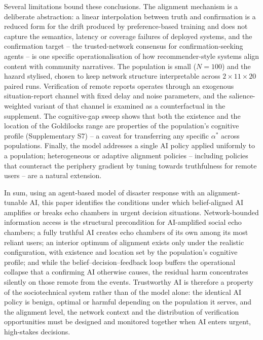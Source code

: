 \documentclass[pdflatex,sn-nature]{sn-jnl}
\begin{document}
Several limitations bound these conclusions. The alignment mechanism is a deliberate abstraction: a linear interpolation between truth and confirmation is a reduced form for the drift produced by preference-based training \citep{sharma2024sycophancy} and does not capture the semantics, latency or coverage failures of deployed systems, and the confirmation target -- the trusted-network consensus for confirmation-seeking agents -- is one specific operationalisation of how recommender-style systems align content with community narratives. The population is small ($N = 100$) and the hazard stylised, chosen to keep network structure interpretable across $2 \times 11 \times 20$ paired runs. Verification of remote reports operates through an exogenous situation-report channel with fixed delay and noise parameters, and the salience-weighted variant of that channel is examined as a counterfactual in the supplement. The cognitive-gap sweep shows that both the existence and the location of the Goldilocks range are properties of the population's cognitive profile (Supplementary S7) -- a caveat for transferring any specific $\alpha^{*}$ across populations. Finally, the model addresses a single AI policy applied uniformly to a population; heterogeneous or adaptive alignment policies -- including policies that counteract the periphery gradient by tuning towards truthfulness for remote users -- are a natural extension.

In sum, using an agent-based model of disaster response with an alignment-tunable AI, this paper identifies the conditions under which belief-aligned AI amplifies or breaks echo chambers in urgent decision situations. Network-bounded information access is the structural precondition for AI-amplified social echo chambers; a fully truthful AI creates echo chambers of its own among its most reliant users; an interior optimum of alignment exists only under the realistic configuration, with existence and location set by the population's cognitive profile; and while the belief--decision--feedback loop buffers the operational collapse that a confirming AI otherwise causes, the residual harm concentrates silently on those remote from the events. Trustworthy AI is therefore a property of the sociotechnical system rather than of the model alone: the identical AI policy is benign, optimal or harmful depending on the population it serves, and the alignment level, the network context and the distribution of verification opportunities must be designed and monitored together when AI enters urgent, high-stakes decisions.
\end{document}
